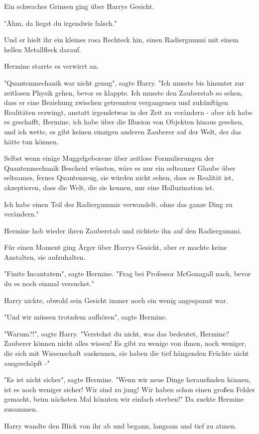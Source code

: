 {Ein schwaches Grinsen ging über Harrys Gesicht.

"Ähm, da liegst du irgendwie falsch."

Und er hielt ihr ein kleines rosa Rechteck hin, einen Radiergummi mit einem hellen Metallfleck darauf.

Hermine starrte es verwirrt an.

"Quantenmechanik war nicht genug", sagte Harry. "Ich musste bis hinunter zur zeitlosen Physik gehen, bevor es klappte. Ich musste den Zauberstab so sehen, dass er eine Beziehung zwischen getrennten vergangenen und zukünftigen Realitäten erzwingt, anstatt irgendetwas in der Zeit zu verändern - aber ich habe es geschafft, Hermine, ich habe über die Illusion von Objekten hinaus gesehen, und ich wette, es gibt keinen einzigen anderen Zauberer auf der Welt, der das hätte tun können.

Selbst wenn einige Muggelgeborene über zeitlose Formulierungen der Quantenmechanik Bescheid wüssten, wäre es nur ein seltsamer Glaube über seltsames, fernes Quantenzeug, sie würden nicht sehen, dass es Realität ist, akzeptieren, dass die Welt, die sie kennen, nur eine Halluzination ist.

Ich habe einen Teil des Radiergummis verwandelt, ohne das ganze Ding zu verändern."

Hermine hob wieder ihren Zauberstab und richtete ihn auf den Radiergummi.

Für einen Moment ging Ärger über Harrys Gesicht, aber er machte keine Anstalten, sie aufzuhalten.

"Finite Incantatem", sagte Hermine. "Frag bei Professor McGonagall nach, bevor du es noch einmal versuchst."

Harry nickte, obwohl sein Gesicht immer noch ein wenig angespannt war.

"Und wir müssen trotzdem aufhören", sagte Hermine.

"Warum?!", sagte Harry. "Verstehst du nicht, was das bedeutet, Hermine? Zauberer können nicht alles wissen! Es gibt zu wenige von ihnen, noch weniger, die sich mit Wissenschaft auskennen, sie haben die tief hängenden Früchte nicht ausgeschöpft -"

"Es ist nicht sicher", sagte Hermine. "Wenn wir neue Dinge herausfinden können, ist es noch weniger sicher! Wir sind zu jung! Wir haben schon einen großen Fehler gemacht, beim nächsten Mal könnten wir einfach sterben!" Da zuckte Hermine zusammen.

Harry wandte den Blick von ihr ab und begann, langsam und tief zu atmen.

}
